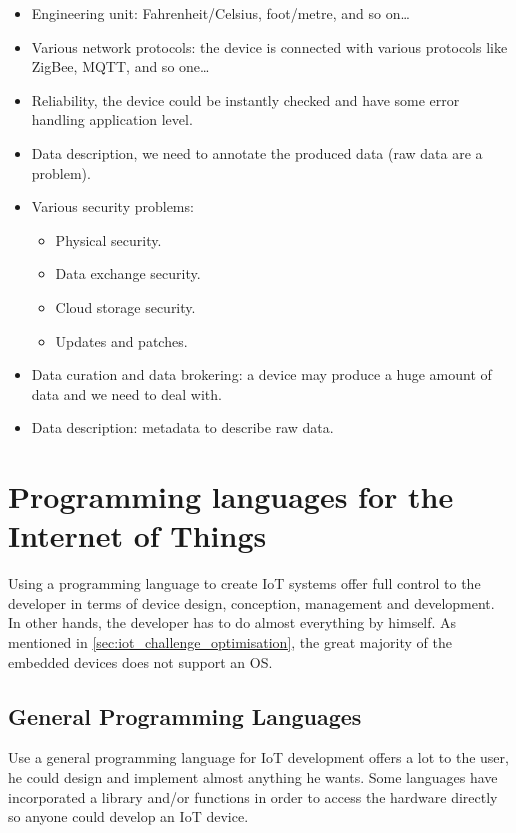 \begin{itemize}
\item Engineering unit: Fahrenheit/Celsius, foot/metre, and so on…
\item Various network protocols: the device is connected with various protocols
like ZigBee, MQTT, and so one…
\item Reliability, the device could be instantly checked and have some error
handling application level.
\item Data description, we need to annotate the produced data (raw data are a
problem).
\item Various security problems:
  \begin{itemize}
  \item Physical security.
  \item Data exchange security.
  \item Cloud storage security.
  \item Updates and patches.
  \end{itemize}
\item Data curation and data brokering: a device may produce a huge amount of
data and we need to deal with.
\item Data description: metadata to describe raw data.
\end{itemize}

\section{Programming languages for the Internet of Things}
\label{sec:pl_for_iot}

Using a programming language to create \gls{IoT} systems offer full control to
the developer in terms of device design, conception, management and development.
In other hands, the developer has to do almost everything by himself. As mentioned
in \ref{sec:iot_challenge_optimisation}, the great majority of the embedded
devices does not support an \gls{OS}.

\subsection{General Programming Languages}
\label{sec:gen_pl}

Use a general programming language for \gls{IoT} development offers a lot to the
user, he could design and implement almost anything he wants. Some languages have
incorporated a library and/or functions in order to access the hardware directly so
anyone could develop an \gls{IoT} device.

